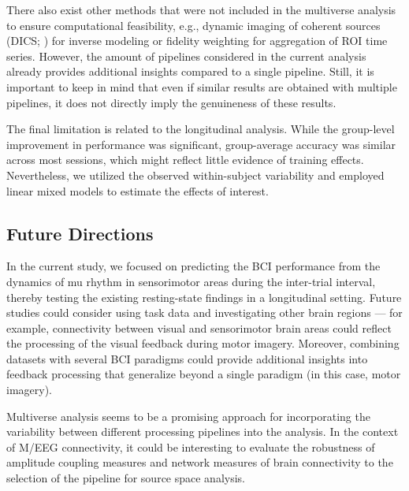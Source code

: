 \medskip

There also exist other methods that were not included in the multiverse analysis to ensure computational feasibility, e.g., dynamic imaging of coherent sources (DICS; \cite{DICS_Gross2001}) for inverse modeling or fidelity weighting \citep{Korhonen2014} for aggregation of ROI time series. However, the amount of pipelines considered in the current analysis already provides additional insights compared to a single pipeline. Still, it is important to keep in mind that even if similar results are obtained with multiple pipelines, it does not directly imply the genuineness of these results.

\medskip 

The final limitation is related to the longitudinal analysis. While the group-level improvement in performance was significant, group-average accuracy was similar across most sessions, which might reflect little evidence of training effects. Nevertheless, we utilized the observed within-subject variability and employed linear mixed models to estimate the effects of interest.

\subsection{Future Directions}

In the current study, we focused on predicting the BCI performance from the dynamics of mu rhythm in sensorimotor areas during the inter-trial interval, thereby testing the existing resting-state findings \citep{Blankertz2010, Vidaurre2020} in a longitudinal setting. Future studies could consider using task data and investigating other brain regions --- for example, connectivity between visual and sensorimotor brain areas could reflect the processing of the visual feedback during motor imagery. Moreover, combining datasets with several BCI paradigms \citep{MOABB2024} could provide additional insights into feedback processing that generalize beyond a single paradigm (in this case, motor imagery).

\medskip

Multiverse analysis seems to be a promising approach for incorporating the variability between different processing pipelines into the analysis. In the context of M/EEG connectivity, it could be interesting to evaluate the robustness of amplitude coupling measures \citep{Hipp2012, Brookes2012} and network measures of brain connectivity \citep{RubinovSporns2010} to the selection of the pipeline for source space analysis.
